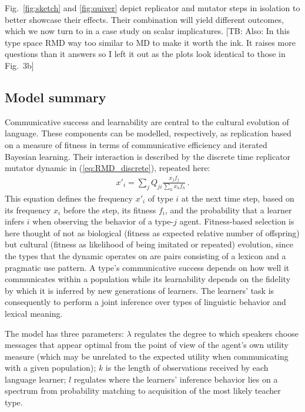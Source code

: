 \documentclass[a4paper, 11pt]{article}
\theoremstyle{Satz}
\newcommand{\tb}[1]{\textcolor[rgb]{.8,.33,.0}{[TB: #1]}}%
\begin{document}
Fig.~\ref{fig:sketch} and \ref{fig:quiver} depict replicator and mutator steps in isolation to better showcase their effects. Their combination will yield different outcomes, which we now turn to in a case study on scalar implicatures. \tb{Also: In this type space RMD way too similar to MD to make it worth the ink. It raises more questions than it answers so I left it out as the plots look identical to those in Fig.~3b}

\subsection{Model summary}

Communicative success and learnability are central to the cultural evolution of language. These
components can be modelled, respectively, as replication based on a measure of fitness in terms
of communicative efficiency and iterated Bayesian learning. Their interaction is described by
the discrete time replicator mutator dynamic in (\ref{eq:RMD_discrete}), repeated here:
\begin{align*}
  x'_i = \sum_j Q_{ji} \frac{x_jf_j}{\sum_h x_h f_h}\,.
\end{align*}
This equation defines the frequency $x'_i$ of type $i$ at the next time step, based on its
frequency $x_i$ before the step, its fitness $f_i$, and the probability that a learner infers
$i$ when observing the behavior of a type-$j$ agent. Fitness-based selection is here thought of
not as biological (fitness as expected relative number of offspring) but cultural (fitness as
likelihood of being imitated or repeated) evolution, since the types that the dynamic operates
on are pairs consisting of a lexicon and a pragmatic use pattern. A type's communicative success depends
on how well it communicates within a population while its learnability depends on the
fidelity by which it is inferred by new generations of learners. The learners' task is
consequently to perform a joint inference over types of linguistic behavior and lexical
meaning.

The model has three parameters: $\lambda$ regulates the degree to which speakers
choose messages that appear optimal from the point of view of the agent's own utility measure
(which may be unrelated to the expected utility when communicating with a given population);
$k$ is the length of observations received by each language learner; $l$ regulates where the learners'
inference behavior lies on a spectrum from probability matching to acquisition of the most likely
teacher type.
\end{document}
